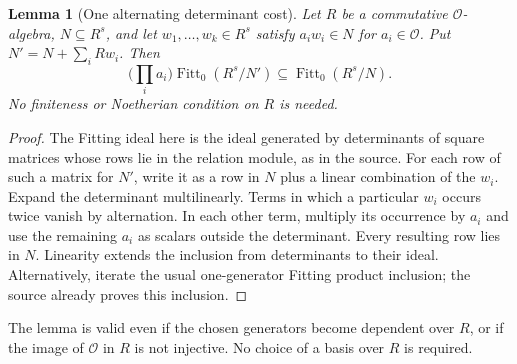 \documentclass[11pt]{article}
\newtheorem{lemma}[theorem]{Lemma}
\theoremstyle{remark}\newtheorem{remark}[theorem]{Remark}
\newcommand{\Ocal}{\mathcal O}
\newcommand{\Fitt}{\operatorname{Fitt}_0}
\begin{document}
\begin{lemma}[One alternating determinant cost]\label{lem:cost}
Let $R$ be a commutative $\Ocal$-algebra, $N\subseteq R^s$, and let $w_1,\ldots,w_k\in R^s$ satisfy $a_iw_i\in N$ for $a_i\in\Ocal$. Put $N'=N+\sum_i Rw_i$. Then
\[
 \Big(\prod_i a_i\Big)\Fitt(R^s/N')\subseteq \Fitt(R^s/N).
\]
No finiteness or Noetherian condition on $R$ is needed.
\end{lemma}
\begin{proof}
The Fitting ideal here is the ideal generated by determinants of square matrices whose rows lie in the relation module, as in the source. For each row of such a matrix for $N'$, write it as a row in $N$ plus a linear combination of the $w_i$. Expand the determinant multilinearly. Terms in which a particular $w_i$ occurs twice vanish by alternation. In each other term, multiply its occurrence by $a_i$ and use the remaining $a_i$ as scalars outside the determinant. Every resulting row lies in $N$. Linearity extends the inclusion from determinants to their ideal. Alternatively, iterate the usual one-generator Fitting product inclusion; the source already proves this inclusion.
\end{proof}
The lemma is valid even if the chosen generators become dependent over $R$, or if the image of $\Ocal$ in $R$ is not injective. No choice of a basis over $R$ is required.
\end{document}
